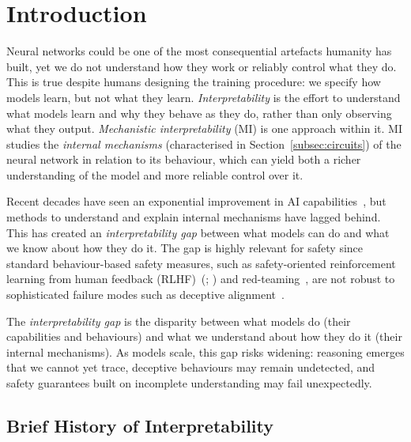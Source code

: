 \section{Introduction}
\label{sec:introduction}
Neural networks could be one of the most consequential artefacts humanity has built, yet we do not understand how they work or reliably control what they do. This is true despite humans designing the training procedure: we specify how models learn, but not what they learn. \emph{Interpretability} is the effort to understand what models learn and why they behave as they do, rather than only observing what they output. \emph{Mechanistic interpretability} (MI) is one approach within it. MI studies the \emph{internal mechanisms} (characterised in Section~\ref{subsec:circuits}) of the neural network in relation to its behaviour, which can yield both a richer understanding of the model and more reliable control over it.

Recent decades have seen an exponential improvement in AI capabilities~, but methods to understand and explain internal mechanisms have lagged behind. This has created an \emph{interpretability gap} between what models can do and what we know about how they do it. The gap is highly relevant for safety since standard behaviour-based safety measures, such as safety-oriented reinforcement learning from human feedback (RLHF)~(; ) and red-teaming~, are not robust to sophisticated failure modes such as deceptive alignment~. 


\begin{definitionbox}
The \emph{interpretability gap} is the disparity between what models do (their capabilities and behaviours) and what we understand about how they do it (their internal mechanisms). As models scale, this gap risks widening: reasoning emerges that we cannot yet trace, deceptive behaviours may remain undetected, and safety guarantees built on incomplete understanding may fail unexpectedly.
\end{definitionbox}

\subsection{Brief History of Interpretability}

